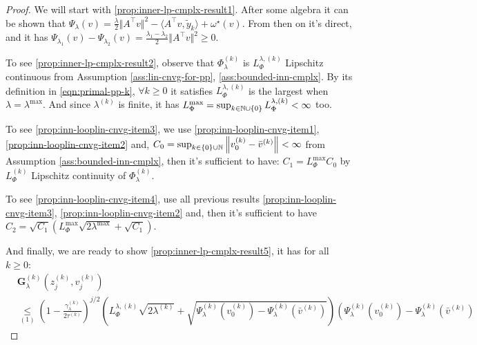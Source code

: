 \documentclass[12pt]{article}
\begin{document}
        \begin{proof}
            We will start with \ref{prop:inner-lp-cmplx-result1}. 
            After some algebra it can be shown that $\Psi_\lambda(v) = \frac{\lambda}{2}\Vert A^\top v\Vert^2 - \langle A^\top v, \tilde y_k\rangle + \omega^\star(v)$.
            From then on it's direct, and it has $\Psi_{\lambda_1}(v) - \Psi_{\lambda_2}(v) = \frac{\lambda_1 - \lambda_2}{2}\Vert A^\top v\Vert^2 \ge 0$. 
            \par
            To see \ref{prop:inner-lp-cmplx-result2}, observe that $\Phi_\lambda^{(k)}$ is $L_{\Phi}^{\lambda, (k)}$ Lipschitz continuous from Assumption \ref{ass:lin-cnvg-for-pp}, \ref{ass:bounded-inn-cmplx}. 
            By its definition in \eqref{eqn:primal-pp-k}, $\forall k \ge 0$ it satisfies $L_{\Phi}^{\lambda, (k)}$ is the largest when $\lambda = \lambda^{\max}$. 
            And since $\lambda^{(k)}$ is finite, it has $L^{\max}_\Phi = \sup_{k \in \mathbb N \cup \{0\}}L_{\Phi}^{\lambda, (k)} < \infty$ too. 
            \par
            To see \ref{prop:inn-looplin-cnvg-item3}, we use \ref{prop:inn-looplin-cnvg-item1}, \ref{prop:inn-looplin-cnvg-item2} and, $C_0 = \sup_{k \in \{0\}\cup \mathbb N} \left\Vert v_0^{(k)} - \bar v^{(k)} \right\Vert < \infty$ from Assumption \ref{ass:bounded-inn-cmplx}, then it's sufficient to have: $C_1 = L_{\Phi}^{\max} C_0$ by $L^{(k)}_\Phi$ Lipschitz continuity of $\Phi_\lambda^{(k)}$. 
            \par
            To see \ref{prop:inn-looplin-cnvg-item4}, use all previous results \ref{prop:inn-looplin-cnvg-item3}, \ref{prop:inn-looplin-cnvg-item2} and, then it's sufficient to have $C_2 = \sqrt{C_1}\left(L^{\max}_\Phi\sqrt{2\lambda^{\max}} + \sqrt{C_1}\right)$. 
            \par
            And finally, we are ready to show \ref{prop:inner-lp-cmplx-result5}, it has for all $k \ge 0$: 
            \begin{align*}
                & \mathbf G_\lambda^{(k)}(z_j^{(k)}, v_j^{(k)}) 
                \\
                &\underset{(1)}{\le} 
                \left(
                    1 - \frac{\gamma_\lambda^{(k)}}{2 \tau^{(k)}}
                \right)^{j/2}
                \left(
                    L_\Phi^{\lambda, (k)} \sqrt{2 \lambda^{(k)}} + 
                    \sqrt{\Psi_{\lambda}^{(k)}(v^{(k)}_0) - \Psi_\lambda^{(k)}(\bar v^{(k)})}
                \right)\left(
                    \Psi_{\lambda}^{(k)}(v^{(k)}_0) - \Psi_\lambda^{(k)}(\bar v^{(k)})

\end{align*}
\end{proof}
\end{document}
